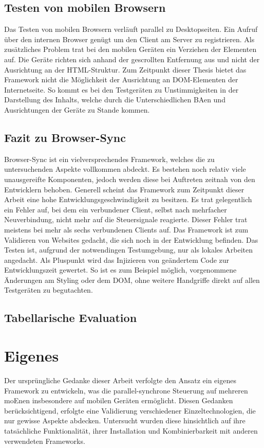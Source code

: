 	\subsection{Testen von mobilen Browsern}
	Das Testen von mobilen Browsern verläuft parallel zu Desktopseiten. Ein Aufruf über den internen Browser genügt um den Client am Server zu registrieren. Als zusätzliches Problem trat bei den mobilen Geräten ein Verziehen der Elementen auf. Die Geräte richten sich anhand der gescrollten Entfernung aus und nicht der Ausrichtung an der \Gls{HTML}-Struktur. Zum Zeitpunkt dieser Thesis bietet das \Gls{Framework} nicht die Möglichkeit der Ausrichtung an \Gls{DOM}-Elementen der Internetseite. So kommt es bei den Testgeräten zu Unstimmigkeiten in der Darstellung des Inhalts, welche durch die Unterschiedlichen \Gls{BA}en und Ausrichtungen der Geräte zu Stande kommen.
	
	\subsection{Fazit zu Browser-Sync}
	Browser-Sync ist ein vielversprechendes \Gls{Framework}, welches die zu untersuchenden Aspekte vollkommen abdeckt. Es bestehen noch relativ viele unausgereifte Komponenten, jedoch werden diese bei Auftreten zeitnah von den Entwicklern behoben. Generell scheint das \Gls{Framework} zum Zeitpunkt dieser Arbeit eine hohe Entwicklungsgeschwindigkeit zu besitzen. Es trat gelegentlich ein Fehler auf, bei dem ein verbundener Client, selbst nach mehrfacher Neuverbindung, nicht mehr auf die Steuersignale reagierte. Dieser Fehler trat meistens bei mehr als sechs verbundenen Clients auf. Das \Gls{Framework} ist zum Validieren von Websites gedacht, die sich noch in der Entwicklung befinden. Das Testen ist, aufgrund der notwendingen Testumgebung, nur als lokales Arbeiten angedacht. Als Pluspunkt wird das Injizieren von geändertem Code zur Entwicklungszeit gewertet. So ist es zum Beispiel möglich, vorgenommene Änderungen am Styling oder dem \Gls{DOM}, ohne weitere Handgriffe direkt auf allen Testgeräten zu begutachten.
	
	\subsection{Tabellarische Evaluation}
	
	
	\section{Eigenes }
	Der ursprüngliche Gedanke dieser Arbeit verfolgte den Ansatz ein eigenes \Gls{Framework} zu entwickeln, was die \gls{parallel-synchron}e Steuerung auf mehreren \Gls{moEn}en insbesondere auf mobilen Geräten ermöglicht. Diesen Gedanken berücksichtigend, erfolgte eine Validierung verschiedener Einzeltechnologien, die nur gewisse Aspekte abdecken. Untersucht wurden diese hinsichtlich auf ihre tatsächliche Funktionalität, ihrer Installation und Kombinierbarkeit mit anderen verwendeten \Gls{Framework}s.
	
